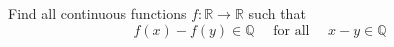 Find all continuous functions \(f\colon  \mathbb{R}\to \mathbb{R}\) such that
\[ f(x)-f(y)\in \mathbb{Q}\quad \text{ for all }\quad x-y\in\mathbb{Q} \]